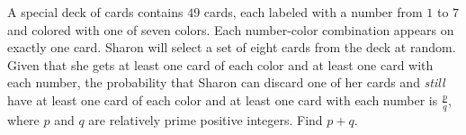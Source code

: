 A special deck of cards contains $49$ cards, each labeled with a number from $1$ to $7$ and colored with one of seven colors. Each number-color combination appears on exactly one card. Sharon will select a set of eight cards from the deck at random. Given that she gets at least one card of each color and at least one card with each number, the probability that Sharon can discard one of her cards and \textit{still} have at least one card of each color and at least one card with each number is $\frac{p}{q}$, where $p$ and $q$ are relatively prime positive integers. Find $p+q$.
